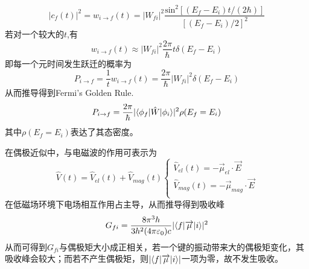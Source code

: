 \begin{description}
\begin{equation}
|c_f(t)|^2=w_{i\rightarrow f}(t)=|W_{fi}|^2\frac{\mathrm{sin}^2[(E_f-E_i)t/(2\hbar)]}{[(E_f-E_i)/2]^2}
\end{equation}
若对一个较大的$t$,有
\begin{equation}
w_{i\rightarrow f}(t)\approx |W_{fi}|^2\frac{2\pi}{\hbar}t\delta(E_f-E_i)
\end{equation}
即每一个元时间发生跃迁的概率为
\begin{equation}
P_{i\rightarrow f}=\frac{1}{t}w_{i\rightarrow f}(t) = \frac{2\pi}{\hbar}|W_{fi}|^2\delta(E_f-E_i)
\end{equation}
从而推导得到Fermi's Golden Rule.
\begin{equation}
P_{i\rightarrow f}=\frac{2\pi}{\hbar}|\langle \phi_f | \hat{W} | \phi_i \rangle|^2\rho(E_f=E_i)
\end{equation}
其中$\rho(E_f=E_i)$表达了其态密度。

在偶极近似中，与电磁波的作用可表示为
\begin{equation}
\hat{V}(t)=\hat{V}_{el}(t)+\hat{V}_{mag}(t)
\begin{cases}
\hat{V}_{el}(t)=-\overrightarrow{\mu}_{el}\cdot \overrightarrow{E}\\
\hat{V}_{mag}(t)=-\overrightarrow{\mu}_{mag}\cdot \overrightarrow{E}\\
\end{cases}
\end{equation}
在低磁场环境下电场相互作用占主导，从而推导得到吸收峰
\begin{equation}
G_{fi}=\frac{8\pi^3h}{3h^2(4\pi\varepsilon_0)c}|\langle f | \overrightarrow{\mu} | i \rangle|^2
\end{equation}
从而可得到$G_{fi}$与偶极矩大小成正相关，若一个键的振动带来大的偶极矩变化，其吸收峰会较大；而若不产生偶极矩，则$|\langle f | \overrightarrow{\mu} | i \rangle|$一项为零，故不发生吸收。
\end{description}   




